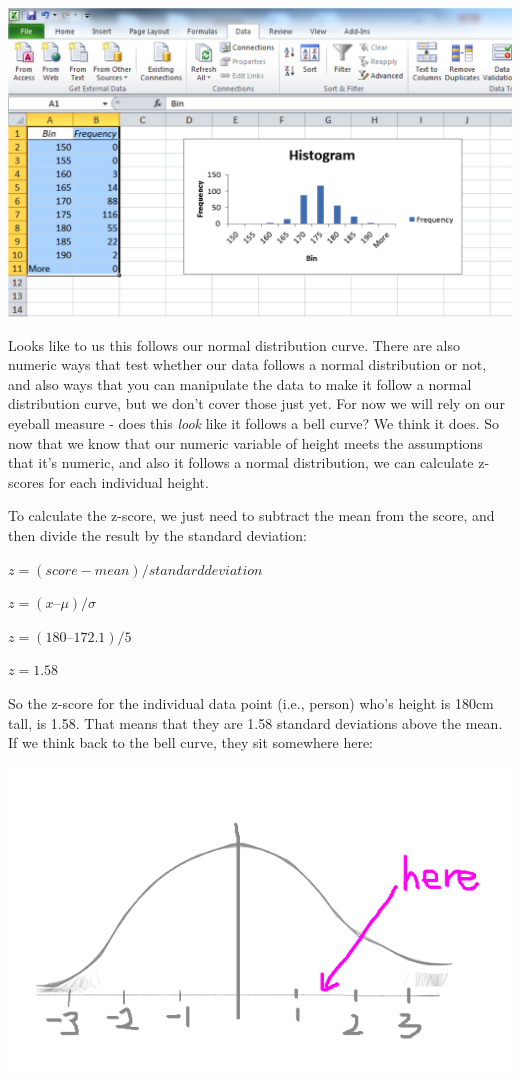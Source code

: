\documentclass[
]{book}
\begin{document}
\includegraphics{imgs/histo.png}

Looks like to us this follows our normal distribution curve. There are also numeric ways that test whether our data follows a normal distribution or not, and also ways that you can manipulate the data to make it follow a normal distribution curve, but we don't cover those just yet. For now we will rely on our eyeball measure - does this \emph{look} like it follows a bell curve? We think it does. So now that we know that our numeric variable of height meets the assumptions that it's numeric, and also it follows a normal distribution, we can calculate z-scores for each individual height.

To calculate the z-score, we just need to subtract the mean from the score, and then divide the result by the standard deviation:

\(z = (score - mean) / standard deviation\)

\(z = (x – μ) / σ\)

\(z = (180 – 172.1) / 5\)

\(z = 1.58\)

So the z-score for the individual data point (i.e., person) who's height is 180cm tall, is 1.58. That means that they are 1.58 standard deviations above the mean. If we think back to the bell curve, they sit somewhere here:

\includegraphics{imgs/your_height_here.png}
\end{document}
